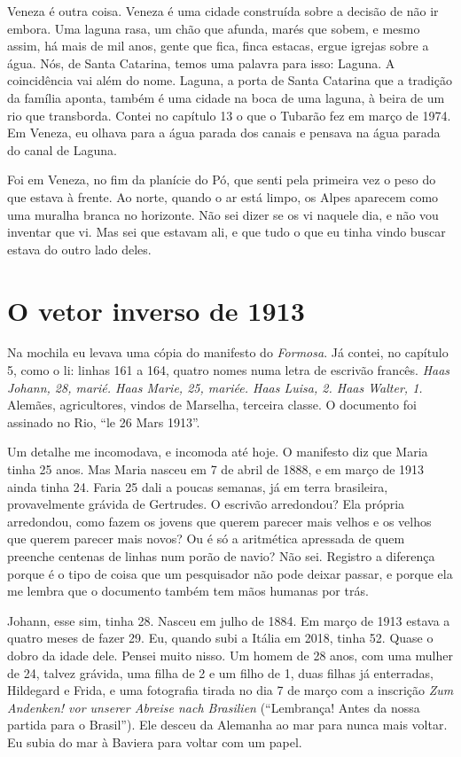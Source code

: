 \documentclass[
  brazilian,
  11pt,
  openany]{book}
\begin{document}
Veneza é outra coisa. Veneza é uma cidade construída sobre a decisão de
não ir embora. Uma laguna rasa, um chão que afunda, marés que sobem, e
mesmo assim, há mais de mil anos, gente que fica, finca estacas, ergue
igrejas sobre a água. Nós, de Santa Catarina, temos uma palavra para
isso: Laguna. A coincidência vai além do nome. Laguna, a porta de Santa
Catarina que a tradição da família aponta, também é uma cidade na boca
de uma laguna, à beira de um rio que transborda. Contei no capítulo 13 o
que o Tubarão fez em março de 1974. Em Veneza, eu olhava para a água
parada dos canais e pensava na água parada do canal de Laguna.

Foi em Veneza, no fim da planície do Pó, que senti pela primeira vez o
peso do que estava à frente. Ao norte, quando o ar está limpo, os Alpes
aparecem como uma muralha branca no horizonte. Não sei dizer se os vi
naquele dia, e não vou inventar que vi. Mas sei que estavam ali, e que
tudo o que eu tinha vindo buscar estava do outro lado deles.

\section{O vetor inverso de 1913}\label{o-vetor-inverso-de-1913}

Na mochila eu levava uma cópia do manifesto do \emph{Formosa}. Já
contei, no capítulo 5, como o li: linhas 161 a 164, quatro nomes numa
letra de escrivão francês. \emph{Haas Johann, 28, marié. Haas Marie, 25,
mariée. Haas Luisa, 2. Haas Walter, 1.} Alemães, agricultores, vindos de
Marselha, terceira classe. O documento foi assinado no Rio, ``le 26 Mars
1913''.

Um detalhe me incomodava, e incomoda até hoje. O manifesto diz que Maria
tinha 25 anos. Mas Maria nasceu em 7 de abril de 1888, e em março de
1913 ainda tinha 24. Faria 25 dali a poucas semanas, já em terra
brasileira, provavelmente grávida de Gertrudes. O escrivão arredondou?
Ela própria arredondou, como fazem os jovens que querem parecer mais
velhos e os velhos que querem parecer mais novos? Ou é só a aritmética
apressada de quem preenche centenas de linhas num porão de navio? Não
sei. Registro a diferença porque é o tipo de coisa que um pesquisador
não pode deixar passar, e porque ela me lembra que o documento também
tem mãos humanas por trás.

Johann, esse sim, tinha 28. Nasceu em julho de 1884. Em março de 1913
estava a quatro meses de fazer 29. Eu, quando subi a Itália em 2018,
tinha 52. Quase o dobro da idade dele. Pensei muito nisso. Um homem de
28 anos, com uma mulher de 24, talvez grávida, uma filha de 2 e um filho
de 1, duas filhas já enterradas, Hildegard e Frida, e uma fotografia
tirada no dia 7 de março com a inscrição \emph{Zum Andenken! vor unserer
Abreise nach Brasilien} (``Lembrança! Antes da nossa partida para o
Brasil''). Ele desceu da Alemanha ao mar para nunca mais voltar. Eu
subia do mar à Baviera para voltar com um papel.
\end{document}

